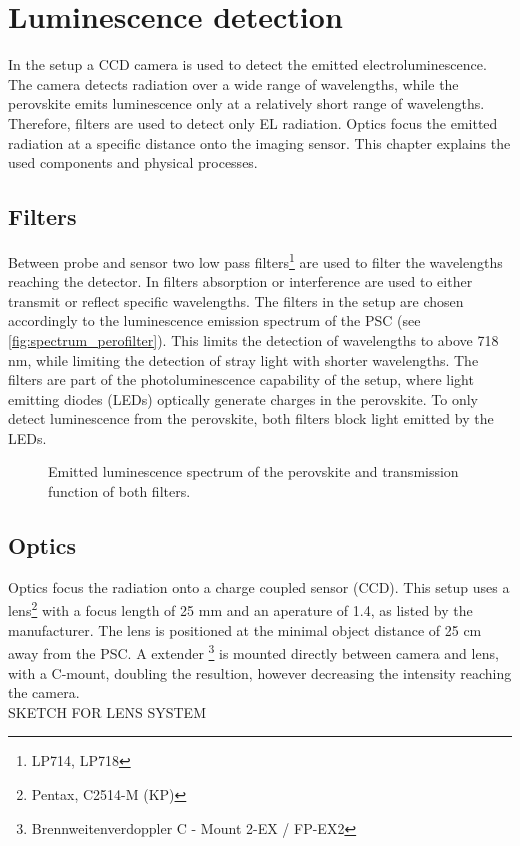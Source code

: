 \section{Luminescence detection}\label{sec:luminescencedetection}
In the setup a CCD camera is used to detect the emitted electroluminescence. The camera detects radiation over a wide range of wavelengths, while the perovskite emits luminescence only at a relatively short range of wavelengths. Therefore, filters are used to detect only EL radiation. Optics focus the emitted radiation at a specific distance onto the imaging sensor. This chapter explains the used components and physical processes.
\subsection{Filters}
Between probe and sensor two low pass filters\footnote{LP714, LP718} are used to filter the wavelengths reaching the detector. In filters absorption or interference are used to either transmit or reflect specific wavelengths. The filters in the setup are chosen accordingly to the luminescence emission spectrum of the PSC (see \autoref{fig:spectrum_perofilter}). This limits the detection of wavelengths to above 718 nm, while limiting the detection of stray light with shorter wavelengths. The filters are part of the photoluminescence capability of the setup, where light emitting diodes (LEDs) optically generate charges in the perovskite. To only detect luminescence from the perovskite, both filters block light emitted by the LEDs.

\begin{figure}[h]
	\centering
	
	\caption{Emitted luminescence spectrum of the perovskite and transmission function of both filters. }
	\label{fig:spectrum_perofilter}
\end{figure}
\subsection{Optics}
Optics focus the radiation onto a charge coupled sensor (CCD). This setup uses a lens\footnote{Pentax, C2514-M (KP)} with a focus length of 25 mm and an aperature of 1.4, as listed by the manufacturer. The lens is positioned at the minimal object distance of  25 cm away from the PSC. A extender \footnote{Brennweitenverdoppler C - Mount 2-EX / FP-EX2} is mounted directly between camera and lens, with a C-mount, doubling the resultion, however decreasing the intensity reaching the camera.
\\
SKETCH FOR LENS SYSTEM
\\


